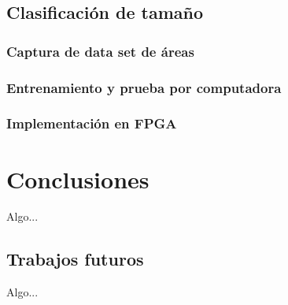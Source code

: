 \documentclass[twoside,spanish,ESP,MSc]{plantillaLabUPV}
\theoremstyle{definition}
\begin{document}
\section{Clasificación de tamaño}
\subsection{Captura de data set de áreas}
\subsection{Entrenamiento y prueba por computadora}
\subsection{Implementación en FPGA}




\chapter{Conclusiones}
Algo...

\section*{Trabajos futuros}
Algo...



\appendix
%


\end{document}
